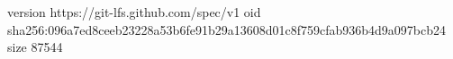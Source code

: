 version https://git-lfs.github.com/spec/v1
oid sha256:096a7ed8ceeb23228a53b6fe91b29a13608d01c8f759cfab936b4d9a097bcb24
size 87544

